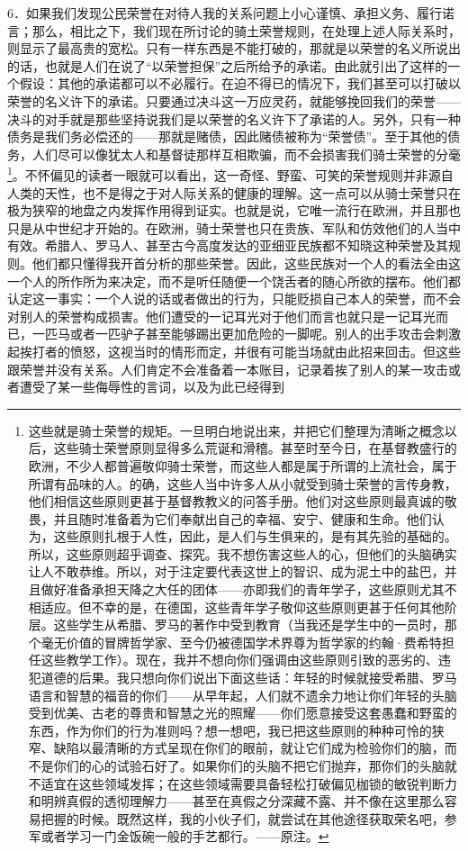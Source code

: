 \documentclass[12pt,oneside]{book}
\begin{document}
6．如果我们发现公民荣誉在对待人我的关系问题上小心谨慎、承担义务、履行诺言；那么，相比之下，我们现在所讨论的骑土荣誉规则，在处理上述人际关系时，则显示了最高贵的宽松。只有一样东西是不能打破的，那就是以荣誉的名义所说出的话，也就是人们在说了“以荣誉担保”之后所给予的承诺。由此就引出了这样的一个假设：其他的承诺都可以不必履行。在迫不得已的情况下，我们甚至可以打破以荣誉的名义许下的承诺。只要通过决斗这一万应灵药，就能够挽回我们的荣誉——决斗的对手就是那些坚持说我们是以荣誉的名义许下了承诺的人。另外，只有一种债务是我们务必偿还的——那就是赌债，因此赌债被称为“荣誉债”。至于其他的债务，人们尽可以像犹太人和基督徒那样互相欺骗，而不会损害我们骑士荣誉的分毫\footnote{这些就是骑士荣誉的规矩。一旦明白地说出来，并把它们整理为清晰之概念以后，这些骑士荣誉原则显得多么荒诞和滑稽。甚至时至今日，在基督教盛行的欧洲，不少人都普遍敬仰骑士荣誉，而这些人都是属于所谓的上流社会，属于所谓有品味的人。的确，这些人当中许多人从小就受到骑士荣誉的言传身教，他们相信这些原则更甚于基督教教义的问答手册。他们对这些原则最真诚的敬畏，并且随时准备着为它们奉献出自己的幸福、安宁、健康和生命。他们认为，这些原则扎根于人性，因此，是人们与生俱来的，是有其先验的基础的。所以，这些原则超乎调查、探究。我不想伤害这些人的心，但他们的头脑确实让人不敢恭维。所以，对于注定要代表这世上的智识、成为泥土中的盐巴，并且做好准备承担天降之大任的团体——亦即我们的青年学子，这些原则尤其不相适应。但不幸的是，在德国，这些青年学子敬仰这些原则更甚于任何其他阶层。这些学生从希腊、罗马的著作中受到教育（当我还是学生中的一员时，那个毫无价值的冒牌哲学家、至今仍被德国学术界尊为哲学家的约翰·费希特担任这些教学工作）。现在，我并不想向你们强调由这些原则引致的恶劣的、违犯道德的后果。我只想向你们说出下面这些话：年轻的时候就接受希腊、罗马语言和智慧的福音的你们——从早年起，人们就不遗余力地让你们年轻的头脑受到优美、古老的尊贵和智慧之光的照耀——你们愿意接受这套愚蠢和野蛮的东西，作为你们的行为准则吗？想一想吧，我已把这些原则的种种可怜的狭窄、缺陷以最清晰的方式呈现在你们的眼前，就让它们成为检验你们的脑，而不是你们的心的试验石好了。如果你们的头脑不把它们抛弃，那你们的头脑就不适宜在这些领域发挥；在这些领域需要具备轻松打破偏见枷锁的敏锐判断力和明辨真假的透彻理解力——甚至在真假之分深藏不露、并不像在这里那么容易把握的时候。既然这样，我的小伙子们，就尝试在其他途径获取荣名吧，参军或者学习一门金饭碗一般的手艺都行。——原注。}。不怀偏见的读者一眼就可以看出，这一奇怪、野蛮、可笑的荣誉规则并非源自人类的天性，也不是得之于对人际关系的健康的理解。这一点可以从骑士荣誉只在极为狭窄的地盘之内发挥作用得到证实。也就是说，它唯一流行在欧洲，并且那也只是从中世纪才开始的。在欧洲，骑士荣誉也只在贵族、军队和仿效他们的人当中有效。希腊人、罗马人、甚至古今高度发达的亚细亚民族都不知晓这种荣誉及其规则。他们都只懂得我开首分析的那些荣誉。因此，这些民族对一个人的看法全由这一个人的所作所为来决定，而不是听任随便一个饶舌者的随心所欲的摆布。他们都认定这一事实：一个人说的话或者做出的行为，只能贬损自己本人的荣誉，而不会对别人的荣誉构成损害。他们遭受的一记耳光对于他们而言也就只是一记耳光而已，一匹马或者一匹驴子甚至能够踢出更加危险的一脚呢。别人的出手攻击会刺激起挨打者的愤怒，这视当时的情形而定，并很有可能当场就由此招来回击。但这些跟荣誉并没有关系。人们肯定不会准备着一本账目，记录着挨了别人的某一攻击或者遭受了某一些侮辱性的言词，以及为此已经得到
\end{document}
